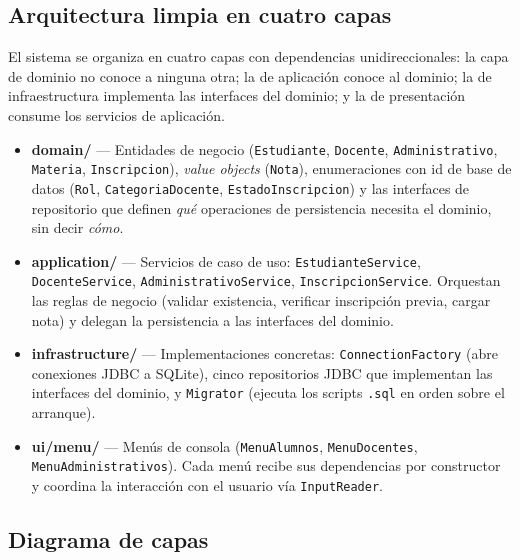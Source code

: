 \documentclass[12pt,a4paper]{article}
\begin{document}
\subsection{Arquitectura limpia en cuatro capas}

El sistema se organiza en cuatro capas con dependencias unidireccionales:
la capa de dominio no conoce a ninguna otra; la de aplicación conoce al
dominio; la de infraestructura implementa las interfaces del dominio; y
la de presentación consume los servicios de aplicación.

\begin{itemize}
    \item \textbf{domain/} --- Entidades de negocio (\texttt{Estudiante},
        \texttt{Docente}, \texttt{Administrativo}, \texttt{Materia},
        \texttt{Inscripcion}), \emph{value objects} (\texttt{Nota}),
        enumeraciones con id de base de datos (\texttt{Rol},
        \texttt{CategoriaDocente}, \texttt{EstadoInscripcion}) y las
        interfaces de repositorio que definen \emph{qué} operaciones de
        persistencia necesita el dominio, sin decir \emph{cómo}.
    \item \textbf{application/} --- Servicios de caso de uso:
        \texttt{EstudianteService}, \texttt{DocenteService},
        \texttt{AdministrativoService}, \texttt{InscripcionService}.
        Orquestan las reglas de negocio (validar existencia, verificar
        inscripción previa, cargar nota) y delegan la persistencia a las
        interfaces del dominio.
    \item \textbf{infrastructure/} --- Implementaciones concretas:
        \texttt{ConnectionFactory} (abre conexiones JDBC a SQLite), cinco
        repositorios JDBC que implementan las interfaces del dominio, y
        \texttt{Migrator} (ejecuta los scripts \texttt{.sql} en orden sobre
        el arranque).
    \item \textbf{ui/menu/} --- Menús de consola (\texttt{MenuAlumnos},
        \texttt{MenuDocentes}, \texttt{MenuAdministrativos}). Cada menú
        recibe sus dependencias por constructor y coordina la interacción
        con el usuario vía \texttt{InputReader}.
\end{itemize}

\subsection{Diagrama de capas}
\end{document}
